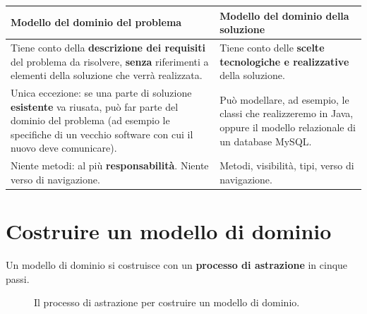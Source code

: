 \begin{table}[H]
\centering
\renewcommand{\arraystretch}{1.4}
\begin{tabularx}{\textwidth}{L L}
\toprule
\textcolor{ph1}{\textbf{Modello del dominio del problema}} & \textcolor{ph4}{\textbf{Modello del dominio della soluzione}} \\
\midrule
Tiene conto della \textbf{descrizione dei requisiti} del problema da risolvere, \textbf{senza} riferimenti a elementi della
soluzione che verrà realizzata. &
Tiene conto delle \textbf{scelte tecnologiche e realizzative} della soluzione. \\
Unica eccezione: se una parte di soluzione \textbf{esistente} va riusata, può far parte del dominio del problema (ad esempio le
specifiche di un vecchio software con cui il nuovo deve comunicare). &
Può modellare, ad esempio, le classi che realizzeremo in Java, oppure il modello relazionale di un database MySQL. \\
Niente metodi: al più \textbf{responsabilità}. Niente verso di navigazione. & Metodi, visibilità, tipi, verso di navigazione. \\
\bottomrule
\end{tabularx}
\end{table}

\section{Costruire un modello di dominio}

Un modello di dominio si costruisce con un \textbf{processo di astrazione} in cinque passi.

\begin{figure}[H]
\centering
{}
\caption{Il processo di astrazione per costruire un modello di dominio.}
\end{figure}

